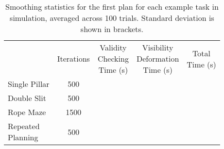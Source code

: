 \begin{table}[ht]
\centering
\caption{Smoothing statistics for the first plan for each example task in simulation, averaged across 100 trials. Standard deviation is shown in brackets.}
\label{tab:smoothing_statistics}
\begin{tabular}{lcccc}
\hline
    & Iterations & \parbox{0.7in}{\centering Validity\\Checking\\Time (s)} & \parbox{0.9in}{\centering Visibility\\Deformation\\Time (s)}& \parbox{0.5in}{\centering \smallskip Total\\Time (s) \smallskip} \\
\noalign{\smallskip}\hline\noalign{\smallskip}
Single Pillar                       &  500 & \parbox{0.5in}{} & \parbox{0.4in}{}       & \parbox{0.3in}{\smallskip{}\smallskip} \\

Double Slit                         &  500 & \parbox{0.5in}{} & \parbox{0.4in}{} & \parbox{0.3in}{\smallskip{}\smallskip} \\

Rope Maze                           & 1500 & \parbox{0.5in}{} & \parbox{0.4in}{} & \parbox{0.3in}{\smallskip{}\smallskip} \\

\parbox{0.6in}{Repeated\\Planning} &  500 & \parbox{0.5in}{} & \parbox{0.4in}{} & \parbox{0.3in}{\smallskip{}\smallskip} \\
\hline
\end{tabular}
\end{table}





